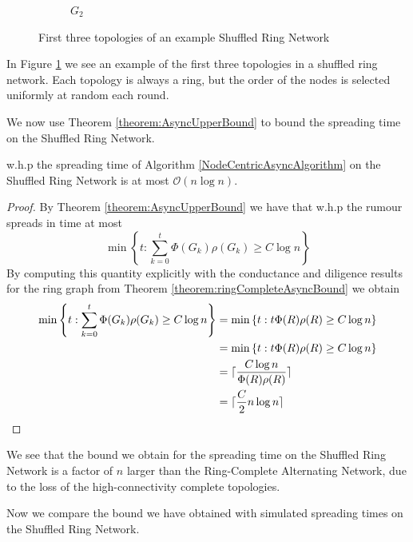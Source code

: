 \begin{figure}[h]
\begin{subfigure}[b]{0.3\textwidth}
		\caption*{$G_2$}
	\end{subfigure}
	\caption{First three topologies of an example Shuffled Ring Network}
	\label{fig:shuffledRingExample}
\end{figure}

In Figure \ref{fig:shuffledRingExample} we see an example of the first three topologies in a shuffled ring network. Each topology is always a ring, but the order of the nodes is selected uniformly at random each round.

We now use Theorem \ref{theorem:AsyncUpperBound} to bound the spreading time on the Shuffled Ring Network.

\begin{theorem}
	w.h.p the spreading time of Algorithm \ref{NodeCentricAsyncAlgorithm} on the Shuffled Ring Network is at most $\mathcal{O}(n \log n)$.
\end{theorem}

\begin{proof}
	By Theorem \ref{theorem:AsyncUpperBound} we have that w.h.p the rumour spreads in time at most 
	$$
		\min \left\{t : \sum_{k=0}^t \Phi(G_k)\rho(G_k) \geq C \log n \right\} 
	$$
	By computing this quantity explicitly with the conductance and diligence results for the ring graph from Theorem \ref{theorem:ringCompleteAsyncBound} we obtain
	\begin{align*}
		\min \left\{t : \sum_{k=0}^t \Phi(G_k)\rho(G_k) \geq C \log n \right\} 
		&= \min \left\{t : t \Phi(R)\rho(R) \geq C \log n \right\} \\
		&= \min \left\{t : t \Phi(R)\rho(R) \geq C \log n \right\} \\
		&= \lceil\frac{C \log n}{\Phi(R)\rho(R)}\rceil \\
		&= \lceil\frac{C}{2}n \log n\rceil
	\end{align*}
\end{proof}

We see that the bound we obtain for the spreading time on the Shuffled Ring Network is a factor of $n$ larger than the Ring-Complete Alternating Network, due to the loss of the high-connectivity complete topologies. 

Now we compare the bound we have obtained with simulated spreading times on the Shuffled Ring Network.


